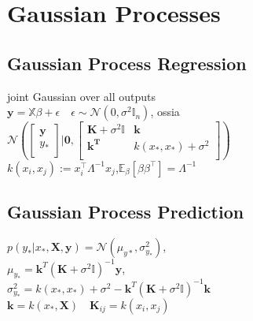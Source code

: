 \section*{Gaussian Processes}

\subsection*{Gaussian Process Regression}
joint Gaussian over all outputs\\
$\mathbf{y}=\mathbb{X}\beta+\epsilon \quad \epsilon\sim \mathcal{N}(0,\sigma^2 \mathbb{I}_n)$, ossia\\
$\mathcal{N}(\begin{bmatrix}
\mathbf{y}\\
y_*\\
\end{bmatrix}|\mathbf{0},\begin{bmatrix}
\mathbf{K}+\sigma^2\mathbb{I} & \mathbf{k} \\
\mathbf{k^T} & k(x_*,x_*) + \sigma^2\\
\end{bmatrix})$\\
$k(x_i,x_j):=x_i^\top\Lambda^{-1}x_j$,$ \mathbb{E}_{\beta}\left[\beta\beta^\top\right]=\Lambda^{-1}$\\

\subsection*{Gaussian Process Prediction}
$p(y_*|x_*,\mathbf{X},\mathbf{y}) = \mathcal{N}(\mu_{y*},\sigma^2_{y_*})$,\\
$\mu_{y_*}=\mathbf{k}^T(\mathbf{K}+\sigma^2\mathbb{I})^{-1}\mathbf{y}$,\\
$\sigma^2_{y_*}=k(x_*,x_*){+}\sigma^2-\mathbf{k}^T(\mathbf{K}+\sigma^2\mathbb{I})^{-1}\mathbf{k}$\\
$\mathbf{k}=k(x_*,\mathbf{X})\quad \mathbf{K}_{ij}=k(x_i,x_j)$